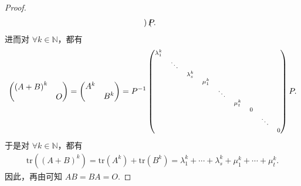 \documentclass[../../main.tex]{subfiles}
\begin{document}
\begin{proof}
\begin{align*}
\begin{scriptsize}
\begin{pmatrix}
\end{pmatrix}\end{scriptsize} P.
\end{align*}
进而对 $\forall k\in \mathbb{N}$，都有
\begin{align*}
\begin{pmatrix}
\left( A+B \right) ^k&		\\
&		O\\
\end{pmatrix} =\begin{pmatrix}
A^k&				\\
&		B^k		\\
\end{pmatrix} =P^{-1}\begin{scriptsize}\begin{pmatrix}
\lambda _{1}^{k}&		&		&		&		&		&		&		&		\\
&		\ddots&		&		&		&		&		&		&		\\
&		&		\lambda _{s}^{k}&		&		&		&		&		&		\\
&		&		&		\mu _{1}^{k}&		&		&		&		&		\\
&		&		&		&		\ddots&		&		&		&		\\
&		&		&		&		&		\mu _{t}^{k}&		&		&		\\
&		&		&		&		&		&		0&		&		\\
&		&		&		&		&		&		&		\ddots&		\\
&		&		&		&		&		&		&		&		0\\
\end{pmatrix}\end{scriptsize} P.
\end{align*}
于是对 $\forall k\in \mathbb{N}$，都有
\begin{align*}
\mathrm{tr}\left( \left( A+B \right) ^k \right) =\mathrm{tr}\left( A^k \right) +\mathrm{tr}\left( B^k \right) =\lambda _{1}^{k}+\cdots +\lambda _{s}^{k}+\mu _{1}^{k}+\cdots +\mu _{t}^{k}.
\end{align*}
因此，再由可知 $AB=BA=O$.


\end{proof}
\end{document}
